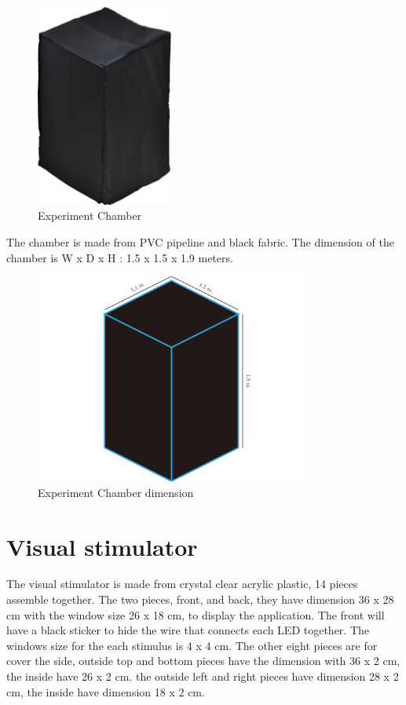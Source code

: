 \begin{figure}[ht]
	\centering
	\includegraphics[width=0.4\textwidth]{chapter6/blackbox.jpg}
	\caption{Experiment Chamber}
\end{figure}
\hspace{1.5cm}The chamber is made from PVC pipeline and black fabric. The dimension of the chamber is W x D x H : 1.5 x 1.5 x 1.9 meters.\\
\begin{figure}[ht]
	\centering
	\includegraphics[width=0.8\textwidth]{chapter6/dark_wire.pdf}
	\caption{Experiment Chamber dimension}
\end{figure}

\section{Visual stimulator}

\hspace{1.5cm}The visual stimulator is made from crystal clear acrylic plastic, 14 pieces assemble together. The two pieces, front, and back, they have dimension 36 x 28 cm with the window size 26 x 18 cm, to display the application. The front will have a black sticker to hide the wire that connects each LED together. The windows size for the each stimulus is 4 x 4 cm. The other eight pieces are for cover the side, outside top and bottom pieces have the dimension with 36 x 2 cm, the inside have 26 x 2 cm. the outside left and right pieces have dimension 28 x 2 cm, the inside have dimension 18 x 2  cm.\\

